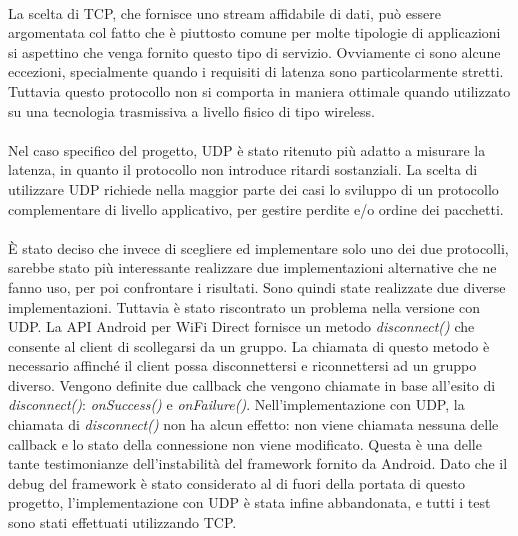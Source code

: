 \documentclass{llncs}
\begin{document}
\paragraph{} La scelta di TCP, che fornisce uno stream affidabile di dati, può essere argomentata col fatto che è piuttosto comune per molte
tipologie di applicazioni si aspettino che venga fornito questo tipo di servizio. Ovviamente ci sono alcune eccezioni, specialmente quando i requisiti di
latenza sono particolarmente stretti. Tuttavia questo protocollo non si comporta in maniera ottimale quando utilizzato su una tecnologia trasmissiva a livello fisico di tipo wireless.
\paragraph{} Nel caso specifico del progetto, UDP è stato ritenuto più adatto a misurare la latenza, in quanto il protocollo non introduce ritardi sostanziali.
La scelta di utilizzare UDP richiede nella maggior parte dei casi lo sviluppo di un protocollo complementare di livello applicativo, per gestire perdite e/o ordine dei pacchetti.
\paragraph{} È stato deciso che invece di scegliere ed implementare solo uno dei due protocolli, sarebbe stato più interessante realizzare due implementazioni alternative che ne fanno uso, per poi confrontare i risultati. Sono quindi state realizzate due diverse implementazioni. Tuttavia è stato riscontrato un
problema nella versione con UDP. La API Android per WiFi Direct fornisce un metodo \emph{disconnect()} che consente al client di scollegarsi da un gruppo. La chiamata di questo metodo è necessario affinché il client possa disconnettersi e riconnettersi ad un gruppo diverso. Vengono definite due callback che vengono
chiamate in base all'esito di \emph{disconnect()}: \emph{onSuccess()} e \emph{onFailure()}. Nell'implementazione con UDP, la chiamata di \emph{disconnect()}
non ha alcun effetto: non viene chiamata nessuna delle callback e lo stato della connessione non viene modificato. Questa è una delle tante testimonianze
dell'instabilità del framework fornito da Android. Dato che il debug del framework è stato considerato al di fuori della portata di questo progetto,
l'implementazione con UDP è stata infine abbandonata, e tutti i test sono stati effettuati utilizzando TCP.
		
\end{document}
